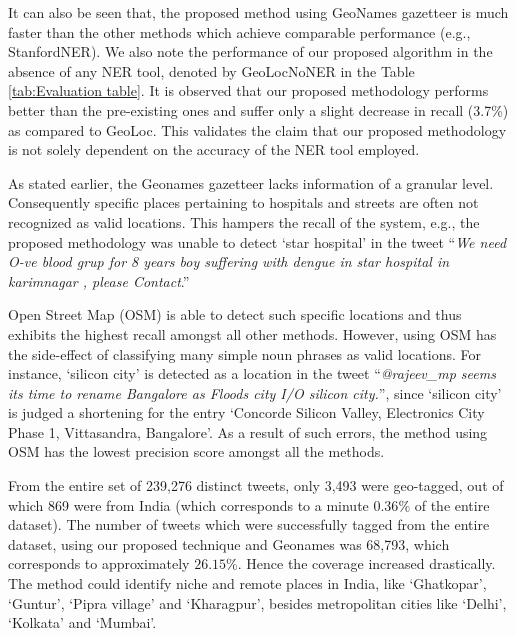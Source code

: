 It can also be seen that, the proposed method using GeoNames gazetteer is much faster than the other methods which achieve comparable performance (e.g., StanfordNER). 
We also note the performance of our proposed algorithm in the absence of any NER tool, denoted by GeoLocNoNER in the Table \ref{tab:Evaluation table}. It is observed that our proposed methodology performs better than the pre-existing ones and suffer only a slight decrease in recall (3.7\%) as compared to GeoLoc. This validates the claim that our proposed methodology is not solely dependent on the accuracy of the NER tool employed. 

\vspace{3mm}
As stated earlier, the Geonames gazetteer lacks information of a granular level. Consequently specific places pertaining to hospitals and streets are often not recognized as valid locations. This hampers the recall of the system, e.g., the proposed methodology was unable to detect `star hospital' in the tweet ``{\it We need O-ve blood grup for 8 years boy suffering with dengue in star hospital in karimnagar , please Contact}.''

Open Street Map (OSM) is able to detect such specific locations and thus exhibits the highest recall amongst all other methods. However, using OSM has the side-effect of classifying many simple noun phrases as valid locations. For instance, 
`silicon city' is detected as a location in the tweet ``{\it @rajeev\_mp  seems its time to rename Bangalore as Floods city I/O silicon city.}'', since `silicon city' is judged a shortening for the entry `Concorde Silicon Valley, Electronics City Phase 1, Vittasandra, Bangalore'. 
As a result of such errors, the method using OSM has the lowest precision score amongst all the methods. 


\vspace{3mm}
From the entire set of 239,276 distinct tweets, only 
3,493 were geo-tagged, out of which 869 were from India (which corresponds to a minute $0.36\%$ of the entire dataset). 
The number of tweets which were successfully tagged from the entire dataset, using our proposed technique and Geonames was 68,793, which corresponds to approximately $26.15\%$. 
Hence the coverage increased drastically. 
The method could identify niche and remote places in India, like `Ghatkopar', `Guntur', `Pipra village' and `Kharagpur', besides metropolitan cities like `Delhi', `Kolkata' and `Mumbai'. 



